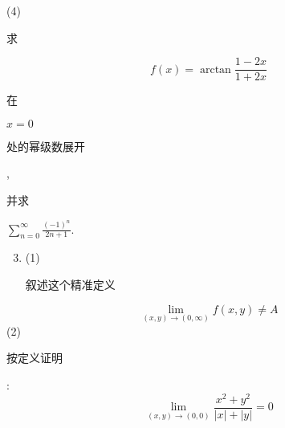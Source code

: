 \documentclass[10pt]{article}
\begin{document}
(4) \begin{CJK}{UTF8}{mj}求\end{CJK}
$$
f(x)=\arctan \frac{1-2 x}{1+2 x}
$$
\begin{CJK}{UTF8}{mj}在\end{CJK} $x=0$ \begin{CJK}{UTF8}{mj}处的幂级数展开\end{CJK}, \begin{CJK}{UTF8}{mj}并求\end{CJK} $\sum_{n=0}^{\infty} \frac{(-1)^{n}}{2 n+1}$.

\begin{enumerate}
  \setcounter{enumi}{2}
  \item (1) \begin{CJK}{UTF8}{mj}叙述这个精准定义\end{CJK}
\end{enumerate}
$$
\lim _{(x, y) \rightarrow(0, \infty)} f(x, y) \neq A
$$
(2) \begin{CJK}{UTF8}{mj}按定义证明\end{CJK}:
$$
\lim _{(x, y) \rightarrow(0,0)} \frac{x^{2}+y^{2}}{|x|+|y|}=0
$$
\end{document}

